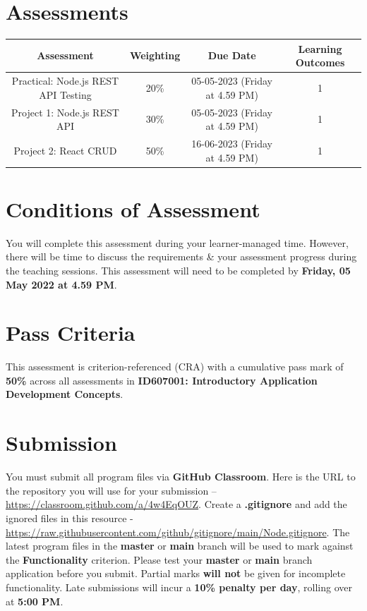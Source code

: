 \documentclass{article}
\begin{document}
\section*{Assessments}
\renewcommand{\arraystretch}{1.5}
\begin{tabular}{|c|c|c|c|}
	\hline
	\textbf{Assessment}                                 & \textbf{Weighting} & \textbf{Due Date}            & \textbf{Learning Outcomes} \\ \hline
	\small Practical: Node.js REST API Testing & \small 20\%        & \small 05-05-2023 (Friday at 4.59 PM)   & \small 1                   \\ \hline
	\small Project 1: Node.js REST API                  & \small 30\%        & \small \small 05-05-2023 (Friday at 4.59 PM) & \small 1                   \\ \hline
	\small Project 2: React CRUD                        & \small 50\%        & \small 16-06-2023 (Friday at 4.59 PM)  & \small 1                   \\ \hline
\end{tabular}

\section*{Conditions of Assessment}
You will complete this assessment during your learner-managed time. However, there will be time to discuss the requirements \& your assessment progress during the teaching sessions. This assessment will need to be completed by \textbf{Friday, 05 May 2022 at 4.59 PM}.

\section*{Pass Criteria}
This assessment is criterion-referenced (CRA) with a cumulative pass mark of \textbf{50\%} across all assessments in \textbf{ID607001: Introductory Application Development Concepts}.

\section*{Submission}
You must submit all program files via \textbf{GitHub Classroom}. Here is the URL to the repository you will use for your submission – \href{https://classroom.github.com/a/4w4EqOUZ}{https://classroom.github.com/a/4w4EqOUZ}.  Create a \textbf{.gitignore} and add the ignored files in this resource - \href{https://raw.githubusercontent.com/github/gitignore/main/Node.gitignore}{https://raw.githubusercontent.com/github/gitignore/main/Node.gitignore}. The latest program files in the \textbf{master} or \textbf{main} branch will be used to mark against the \textbf{Functionality} criterion. Please test your \textbf{master} or \textbf{main} branch application before you submit. Partial marks \textbf{will not} be given for incomplete functionality. Late submissions will incur a \textbf{10\% penalty per day}, rolling over at \textbf{5:00 PM}.
\end{document}
